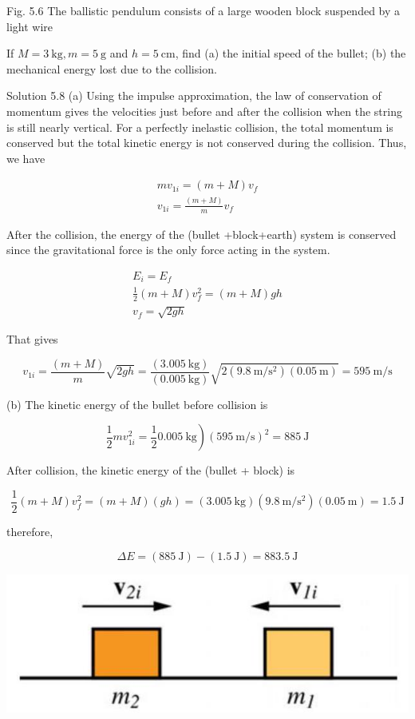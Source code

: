 \documentclass[10pt]{article}
\begin{document}
Fig. 5.6 The ballistic pendulum consists of a large wooden block suspended by a light wire

If $M=3 \mathrm{~kg}, m=5 \mathrm{~g}$ and $h=5 \mathrm{~cm}$, find (a) the initial speed of the bullet; (b) the mechanical energy lost due to the collision.

Solution 5.8 (a) Using the impulse approximation, the law of conservation of momentum gives the velocities just before and after the collision when the string is still nearly vertical. For a perfectly inelastic collision, the total momentum is conserved but the total kinetic energy is not conserved during the collision. Thus, we have

$$
\begin{gathered}
m v_{1 i}=(m+M) v_{f} \\
v_{1 i}=\frac{(m+M)}{m} v_{f}
\end{gathered}
$$

After the collision, the energy of the (bullet +block+earth) system is conserved since the gravitational force is the only force acting in the system.

$$
\begin{gathered}
E_{i}=E_{f} \\
\frac{1}{2}(m+M) v_{f}^{2}=(m+M) g h \\
v_{f}=\sqrt{2 g h}
\end{gathered}
$$

That gives

$$
v_{1 i}=\frac{(m+M)}{m} \sqrt{2 g h}=\frac{(3.005 \mathrm{~kg})}{(0.005 \mathrm{~kg})} \sqrt{2\left(9.8 \mathrm{~m} / \mathrm{s}^{2}\right)(0.05 \mathrm{~m})}=595 \mathrm{~m} / \mathrm{s}
$$

(b) The kinetic energy of the bullet before collision is

$$
\left.\frac{1}{2} m v_{1 i}^{2}=\frac{1}{2} 0.005 \mathrm{~kg}\right)(595 \mathrm{~m} / \mathrm{s})^{2}=885 \mathrm{~J}
$$

After collision, the kinetic energy of the (bullet + block) is

$$
\frac{1}{2}(m+M) v_{f}^{2}=(m+M)(g h)=(3.005 \mathrm{~kg})\left(9.8 \mathrm{~m} / \mathrm{s}^{2}\right)(0.05 \mathrm{~m})=1.5 \mathrm{~J}
$$

therefore,

$$
\Delta E=(885 \mathrm{~J})-(1.5 \mathrm{~J})=883.5 \mathrm{~J}
$$

\begin{center}
\includegraphics[max width=\textwidth]{2024_09_13_db1f357d2aad0a03eb2eg-087}
\end{center}
\end{document}

